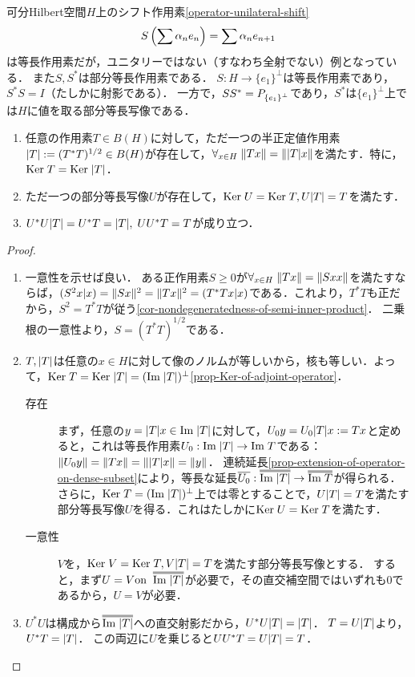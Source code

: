 \documentclass[uplatex,dvipdfmx]{jsreport}
\begin{document}
\begin{example}
    可分Hilbert空間$H$上のシフト作用素\ref{operator-unilateral-shift}
    \[S\left(\sum\alpha_ne_n\right)=\sum\alpha_ne_{n+1}\]
    は等長作用素だが，ユニタリーではない（すなわち全射でない）例となっている．
    また$S,S^*$は部分等長作用素である．
    $S:H\to\{e_1\}^\perp$は等長作用素であり，$S^*S=I$（たしかに射影である）．
    一方で，$SS^*=P_{\left\{e_1\right\}^\perp}$であり，$S^*$は$\{e_1\}^\perp$上では$H$に値を取る部分等長写像である．
\end{example}

\begin{theorem}\mbox{}\label{thm-polar-decomposition}
    \begin{enumerate}
        \item 任意の作用素$T\in B(H)$に対して，ただ一つの半正定値作用素$\lvert T\rvert:=(T^*T)^{1/2}\in B(H)$が存在して，$\forall_{x\in H}\;\|Tx\|=\|\lvert T\rvert x\|$を満たす．特に，$\mathrm{Ker}\; T=\mathrm{Ker}\;\lvert T\rvert$．
        \item ただ一つの部分等長写像$U$が存在して，$\mathrm{Ker}\; U=\mathrm{Ker}\; T,U\lvert T\rvert=T$を満たす．
        \item $U^*U\lvert T\rvert=U^*T=\lvert T\rvert,\;UU^*T=T$が成り立つ．
    \end{enumerate}
\end{theorem}
\begin{proof}\mbox{}
    \begin{enumerate}
        \item 一意性を示せば良い．
        ある正作用素$S\ge0$が$\forall_{x\in H}\;\|Tx\|=\|Sxx\|$を満たすならば，$(S^2x|x)=\|Sx\|^2=\|Tx\|^2=(T^*Tx|x)$である．これより，$T^*T$も正だから，$S^2=T^*T$が従う\ref{cor-nondegeneratedness-of-semi-inner-product}．
        二乗根の一意性より，$S=(T^*T)^{1/2}$である．
        \item $T,\lvert T\rvert$は任意の$x\in H$に対して像のノルムが等しいから，核も等しい．よって，$\mathrm{Ker}\; T=\mathrm{Ker}\;\lvert T\rvert=(\mathrm{Im}\;\lvert T\rvert)^\perp$\ref{prop-Ker-of-adjoint-operator}．
        \begin{description}
            \item[存在] まず，任意の$y=\lvert T\rvert x\in\mathrm{Im}\;\lvert T\rvert$に対して，$U_0y=U_0\lvert T\rvert x:=Tx$と定めると，これは等長作用素$U_0:\mathrm{Im}\;\lvert T\rvert\to\mathrm{Im}\; T$である：$\|U_0y\|=\|Tx\|=\|\lvert T\rvert x\|=\|y\|$．
            連続延長\ref{prop-extension-of-operator-on-dense-subset}により，等長な延長$\o{U_0}:\oo{\Im\abs{T}}\to\oo{\Im T}$が得られる．
            さらに，$\mathrm{Ker}\; T=(\mathrm{Im}\;\lvert T\rvert)^\perp$上では零とすることで，$U\lvert T\rvert=T$を満たす部分等長写像$U$を得る．これはたしかに$\mathrm{Ker}\; U=\mathrm{Ker}\; T$を満たす．
            \item[一意性] 
            $V$を，$\mathrm{Ker}\; V=\mathrm{Ker}\; T,V\lvert T\rvert=T$を満たす部分等長写像とする．
            すると，まず$U=V\on\;\oo{\Im\abs{T}}$が必要で，その直交補空間ではいずれも$0$であるから，$U=V$が必要．
        \end{description}
        \item $U^*U$は構成から$\oo{\Im\abs{T}}$への直交射影だから，$U^*U\lvert T\rvert=\lvert T\rvert$．
        $T=U\lvert T\rvert$より，$U^*T=\lvert T\rvert$．
        この両辺に$U$を乗じると$UU^*T=U\lvert T\rvert=T$．
    \end{enumerate}
\end{proof}
\end{document}
